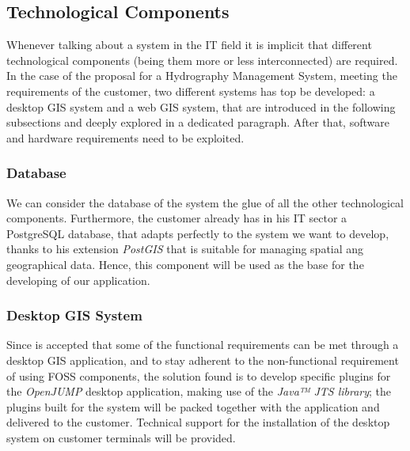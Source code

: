 \subsection{Technological Components}
Whenever talking about a system in the IT field it is implicit that different technological components (being them more or less interconnected) are required. In the case of the proposal for a Hydrography Management System, meeting the requirements of the customer, two different systems has top be developed: a desktop GIS system and a web GIS system, that are introduced in the following subsections and deeply explored in a dedicated paragraph. After that, software and hardware requirements need to be exploited.

\subsubsection{Database}
We can consider the database of the system the glue of all the other technological components. Furthermore, the customer already has in his IT sector a PostgreSQL database, that adapts perfectly to the system we want to develop, thanks to his extension \textit{PostGIS} that is suitable for managing spatial ang geographical data. Hence, this component will be used as the base for the developing of our application.
\subsubsection{Desktop GIS System}
Since is accepted that some of the functional requirements can be met through a desktop GIS application, and to stay adherent to the non-functional requirement of using FOSS components, the solution found is to develop specific plugins for the \textit{OpenJUMP} desktop application, making use of the \textit{Java™ JTS library}; the plugins built for the system will be packed together with the application and delivered to the customer. Technical support for the installation of the desktop system on customer terminals will be provided.
